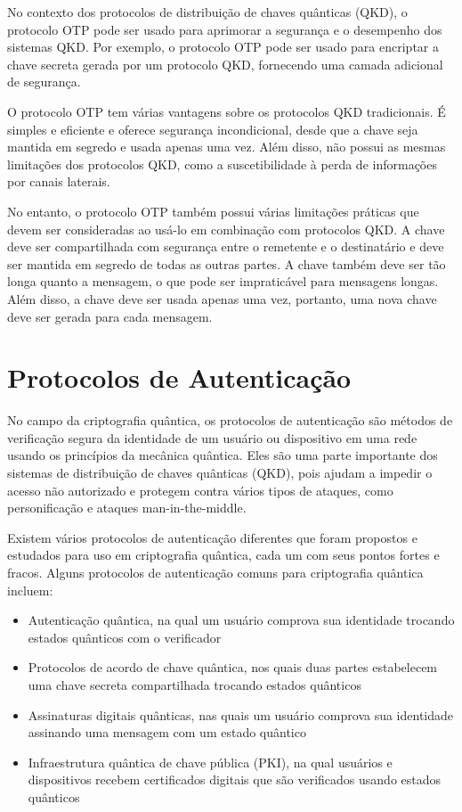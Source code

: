 No contexto dos protocolos de distribuição de chaves quânticas (QKD), o protocolo OTP pode ser usado para aprimorar a segurança e o desempenho dos sistemas QKD. Por exemplo, o protocolo OTP pode ser usado para encriptar a chave secreta gerada por um protocolo QKD, fornecendo uma camada adicional de segurança.

O protocolo OTP tem várias vantagens sobre os protocolos QKD tradicionais. É simples e eficiente e oferece segurança incondicional, desde que a chave seja mantida em segredo e usada apenas uma vez. Além disso, não possui as mesmas limitações dos protocolos QKD, como a suscetibilidade à perda de informações por canais laterais.

No entanto, o protocolo OTP também possui várias limitações práticas que devem ser consideradas ao usá-lo em combinação com protocolos QKD. A chave deve ser compartilhada com segurança entre o remetente e o destinatário e deve ser mantida em segredo de todas as outras partes. A chave também deve ser tão longa quanto a mensagem, o que pode ser impraticável para mensagens longas. Além disso, a chave deve ser usada apenas uma vez, portanto, uma nova chave deve ser gerada para cada mensagem.

\newpage

\section{Protocolos de Autenticação}

No campo da criptografia quântica, os protocolos de autenticação são métodos de verificação segura da identidade de um usuário ou dispositivo em uma rede usando os princípios da mecânica quântica. Eles são uma parte importante dos sistemas de distribuição de chaves quânticas (QKD), pois ajudam a impedir o acesso não autorizado e protegem contra vários tipos de ataques, como personificação e ataques man-in-the-middle.

Existem vários protocolos de autenticação diferentes que foram propostos e estudados para uso em criptografia quântica, cada um com seus pontos fortes e fracos. Alguns protocolos de autenticação comuns para criptografia quântica incluem:

\begin{itemize}
  \item Autenticação quântica, na qual um usuário comprova sua identidade trocando estados quânticos com o verificador
  \item Protocolos de acordo de chave quântica, nos quais duas partes estabelecem uma chave secreta compartilhada trocando estados quânticos
  \item Assinaturas digitais quânticas, nas quais um usuário comprova sua identidade assinando uma mensagem com um estado quântico
  \item Infraestrutura quântica de chave pública (PKI), na qual usuários e dispositivos recebem certificados digitais que são verificados usando estados quânticos
\end{itemize}

